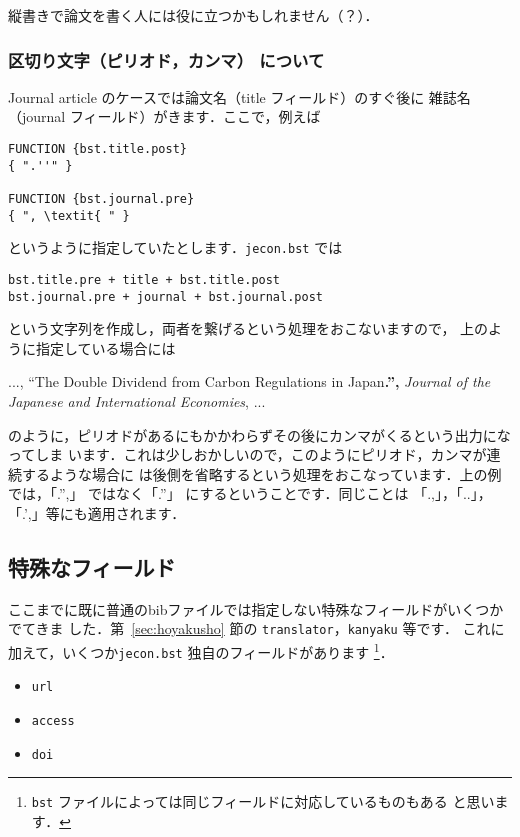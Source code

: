 \documentclass[a4j,10pt]{jarticle}
\begin{document}
縦書きで論文を書く人には役に立つかもしれません（？）．

\subsubsection{区切り文字（ピリオド，カンマ） について}

Journal article のケースでは論文名（title フィールド）のすぐ後に
雑誌名（journal フィールド）がきます．ここで，例えば
\begin{screen}
\begin{verbatim}
FUNCTION {bst.title.post}
{ ".''" }

FUNCTION {bst.journal.pre}
{ ", \textit{ " }
\end{verbatim}
\end{screen}
というように指定していたとします．\texttt{jecon.bst} では
\begin{center}
\verb|bst.title.pre + title + bst.title.post| \\
\verb|bst.journal.pre + journal + bst.journal.post|
\end{center}
という文字列を作成し，両者を繋げるという処理をおこないますので，
上のように指定している場合には
\begin{flushleft}
 ..., ``The Double Dividend from Carbon Regulations in Japan\textbf{.'',} \textit{Journal of the Japanese and International Economies}, ...
\end{flushleft}
のように，ピリオドがあるにもかかわらずその後にカンマがくるという出力になってしま
います．これは少しおかしいので，このようにピリオド，カンマが連続するような場合に
は後側を省略するという処理をおこなっています．上の例では，「.'',」 ではなく「.''」
にするということです．同じことは 「.,」，「..」，「.',」等にも適用されます．


\subsection{特殊なフィールド}

ここまでに既に普通のbibファイルでは指定しない特殊なフィールドがいくつかでてきま
した．第~\ref{sec:hoyakusho} 節の \texttt{translator}，\texttt{kanyaku} 等です．
これに加えて，いくつか\texttt{jecon.bst} 独自のフィールドがあります
\footnote{\texttt{bst} ファイルによっては同じフィールドに対応しているものもある
と思います．}．
\begin{itemize}
 \item \texttt{url}
 \item \texttt{access}
 \item \texttt{doi}
\end{itemize}
\end{document}
